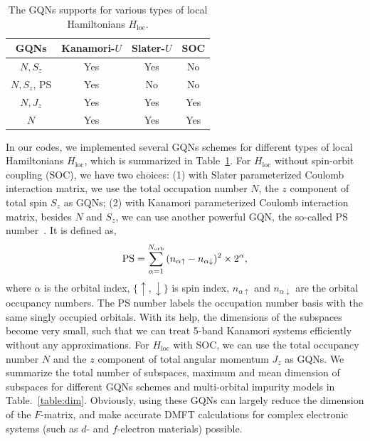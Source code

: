 \begin{table}[t]
\caption{The GQNs supports for various types of local Hamiltonians $H_{\text{loc}}$. \label{table:good}}
\centering
\begin{tabular}{cccc}
\hline
\hline
 GQNs                   & Kanamori-$U$ & Slater-$U$ &  SOC \\
\hline
$N, S_{z}$              & Yes          & Yes        & No   \\ 
$N, S_{z}$, PS          & Yes          & No         & No   \\ 
$N, J_{z}$              & Yes          & Yes        & Yes  \\
$N$                     & Yes          & Yes        & Yes  \\ 
\hline
\hline
\end{tabular}
\end{table}

In our codes, we implemented several GQNs schemes for different types of local Hamiltonians $H_{\text{loc}}$, which is summarized in Table~\ref{table:good}. For $H_{\text{loc}}$ without spin-orbit coupling (SOC), we have two choices: (1) with Slater parameterized Coulomb interaction matrix, we use the total occupation number $N$, the $z$ component of total spin $S_{z}$ as GQNs; (2) with Kanamori parameterized Coulomb interaction matrix, besides $N$ and $S_{z}$, we can use another powerful GQN, the so-called PS number~\cite{PhysRevB.86.155158}. It is defined as,
\begin{equation}
\text{PS} = \sum_{\alpha=1}^{N_{\text{orb}}} \\
             (n_{\alpha\uparrow}-n_{\alpha\downarrow})^2 \times 2^{\alpha},
\end{equation}
where $\alpha$ is the orbital index, $\{\uparrow, \downarrow\}$ is spin index, $n_{\alpha\uparrow}$ and $n_{\alpha\downarrow}$ are the orbital occupancy numbers. The PS number labels the occupation number basis with the same singly occupied orbitals. With its help, the dimensions of the subspaces become very small, such that we can treat 5-band Kanamori systems efficiently without any approximations. For $H_{\text{loc}}$ with SOC, we can use the total occupancy number $N$ and the $z$ component of total angular momentum $J_{z}$ as GQNs. We summarize the total number of subspaces, maximum and mean dimension of subspaces for different GQNs schemes and multi-orbital impurity models in Table.~\ref{table:dim}. Obviously, using these GQNs can largely reduce the dimension of the $F$-matrix, and make accurate DMFT calculations for complex electronic systems (such as $d$- and $f$-electron materials) possible. 

